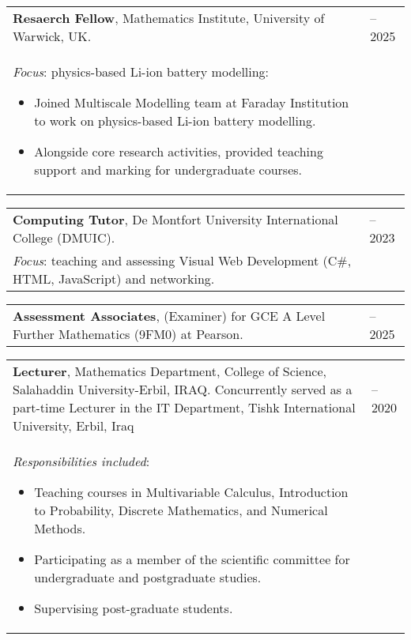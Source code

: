 \documentclass[line]{res}
\newenvironment{p1}
{\begin{adjustwidth}{-30pt}{0pt}
\vspace{8pt}}
{\end{adjustwidth}}
\begin{document}
\begin{resume}
\begin{p1}
\begin{tabular}{p{} >{\raggedleft\arraybackslash}p{}}
	\textbf{Resaerch Fellow}, Mathematics Institute, University of Warwick, UK. & 2023--2025\\
	\textit{Focus}: physics-based Li-ion battery modelling:
	\begin{itemize}
		\item Joined Multiscale Modelling team at Faraday Institution to work on physics-based Li-ion battery modelling.
		\item Alongside core research activities, provided teaching support and marking for undergraduate courses.
	\end{itemize}
\end{tabular}


\begin{tabular}{p{} >{\raggedleft\arraybackslash}p{}}
	\textbf{Computing Tutor}, De Montfort University International College (DMUIC). & 2022--2023\\
	\textit{Focus}: teaching and assessing Visual Web Development (C\#, HTML, JavaScript) and  networking.
\end{tabular}

\vspace{5pt}
\begin{tabular}{p{} >{\raggedleft\arraybackslash}p{}}
	\textbf{Assessment Associates}, (Examiner) for GCE A Level Further Mathematics (9FM0) at Pearson. & 2022--2025\\
\end{tabular}

\vspace{5pt}
\begin{tabular}{p{} >{\raggedleft\arraybackslash}p{}}
	\textbf{Lecturer}, Mathematics Department, College of Science, Salahaddin University-Erbil, IRAQ.  Concurrently served as a part-time Lecturer in the IT Department, Tishk International University, Erbil, Iraq& 2019--2020 \\
	\textit{Responsibilities included}:
	\begin{itemize}
		\item Teaching courses in Multivariable Calculus, Introduction to Probability, Discrete Mathematics, and Numerical Methods.
		\item Participating as a member of the scientific committee for undergraduate and postgraduate studies.
		\item Supervising post-graduate students.	
	\end{itemize}
\end{tabular}


\end{p1}
\end{resume}
\end{document}
